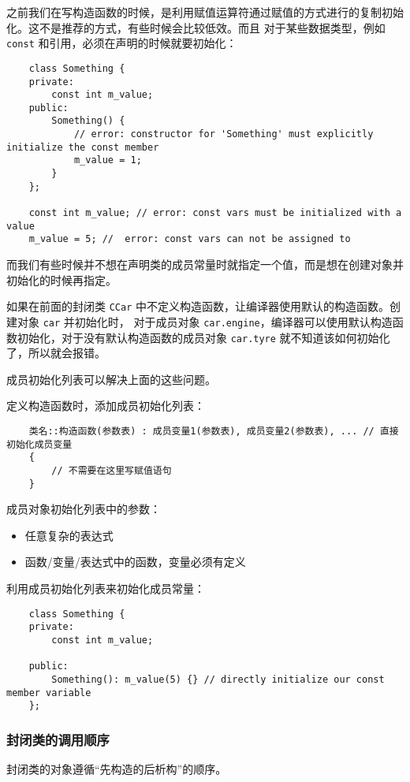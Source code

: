 \documentclass[UTF8]{ctexart}
\begin{document}
之前我们在写构造函数的时候，是利用赋值运算符通过赋值的方式进行的复制初始化。这不是推荐的方式，有些时候会比较低效。而且
对于某些数据类型，例如 \texttt{const} 和引用，必须在声明的时候就要初始化：
\begin{verbatim}
    class Something {
    private:
        const int m_value;
    public:
        Something() {
            // error: constructor for 'Something' must explicitly initialize the const member
            m_value = 1;
        }
    };

    const int m_value; // error: const vars must be initialized with a value
    m_value = 5; //  error: const vars can not be assigned to
\end{verbatim}

而我们有些时候并不想在声明类的成员常量时就指定一个值，而是想在创建对象并初始化的时候再指定。

如果在前面的封闭类 \texttt{CCar} 中不定义构造函数，让编译器使用默认的构造函数。创建对象 \texttt{car} 并初始化时，
对于成员对象 \texttt{car.engine}，编译器可以使用默认构造函数初始化，对于没有默认构造函数的成员对象
\texttt{car.tyre} 就不知道该如何初始化了，所以就会报错。

成员初始化列表可以解决上面的这些问题。

定义构造函数时，添加成员初始化列表：
\begin{verbatim}
    类名::构造函数(参数表) : 成员变量1(参数表), 成员变量2(参数表), ... // 直接初始化成员变量
    {
        // 不需要在这里写赋值语句
    }
\end{verbatim}

成员对象初始化列表中的参数：
\begin{itemize}
    \item 任意复杂的表达式
    \item 函数/变量/表达式中的函数，变量必须有定义
\end{itemize}

利用成员初始化列表来初始化成员常量：
\begin{verbatim}
    class Something {
    private:
        const int m_value;

    public:
        Something(): m_value(5) {} // directly initialize our const member variable
    };
\end{verbatim}

\subsubsection{封闭类的调用顺序}
封闭类的对象遵循“先构造的后析构”的顺序。
\end{document}
